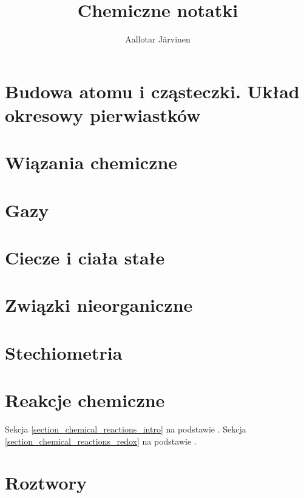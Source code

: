 \documentclass{createspace}
\author{Aallotar Järvinen}
\title{Chemiczne notatki}
\begin{document}





\tableofcontents

\chapter{Budowa atomu i cząsteczki. Układ okresowy pierwiastków}



\chapter{Wiązania chemiczne}

\chapter{Gazy}


\chapter{Ciecze i ciała stałe}


\chapter{Związki nieorganiczne}





\chapter{Stechiometria}


\chapter{Reakcje chemiczne}




Sekcja \ref{section_chemical_reactions_intro} na podstawie \cite[s. 91-97]{jones_atkins}.
Sekcja \ref{section_chemical_reactions_redox} na podstawie \cite[s. 118-126]{jones_atkins}.

\chapter{Roztwory}
\end{document}
